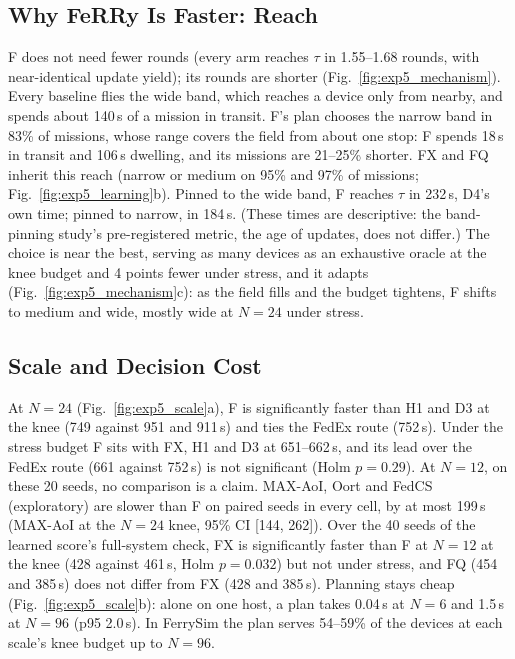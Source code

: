 
\subsection{Why FeRRy Is Faster: Reach}
\label{sec:res:mechanism}

F does not need fewer rounds (every arm reaches $\tau$ in 1.55--1.68 rounds,
with near-identical update yield); its rounds are shorter
(Fig.~\ref{fig:exp5_mechanism}). Every baseline flies the wide band, which
reaches a device only from nearby, and spends about 140\,s of a mission in
transit. F's plan chooses the narrow band in 83\% of missions, whose range
covers the field from about one stop: F spends 18\,s in transit and 106\,s
dwelling, and its missions are 21--25\% shorter. FX and FQ inherit this reach
(narrow or medium on 95\% and 97\% of missions; Fig.~\ref{fig:exp5_learning}b).
Pinned to the wide band, F reaches $\tau$ in 232\,s, D4's own time; pinned to
narrow, in 184\,s. (These times are descriptive: the band-pinning study's
pre-registered metric, the age of updates, does not differ.) The choice is near
the best, serving as many devices as an exhaustive oracle at the knee budget and
4 points fewer under stress, and it adapts (Fig.~\ref{fig:exp5_mechanism}c): as the
field fills and the budget tightens, F shifts to medium and wide, mostly wide at
$N=24$ under stress.


\subsection{Scale and Decision Cost}
\label{sec:res:scale}

At $N=24$ (Fig.~\ref{fig:exp5_scale}a), F is significantly faster than H1 and D3
at the knee (749 against 951 and 911\,s) and ties the FedEx route (752\,s). Under
the stress budget F sits with FX, H1 and D3 at 651--662\,s, and its lead over the
FedEx route (661 against 752\,s) is not significant (Holm $p=0.29$). At $N=12$, on
these 20 seeds, no comparison is a claim. MAX-AoI, Oort and FedCS (exploratory) are slower than F on paired seeds in every cell, by at most
199\,s (MAX-AoI at the $N=24$ knee, 95\% CI [144, 262]). Over the 40 seeds of the
learned score's full-system check, FX is significantly faster than F at $N=12$ at the knee (428 against
461\,s, Holm $p=0.032$) but not under stress, and FQ (454 and 385\,s) does not
differ from FX (428 and 385\,s).
Planning stays cheap (Fig.~\ref{fig:exp5_scale}b): alone on one host, a plan
takes 0.04\,s at $N=6$ and 1.5\,s at $N=96$ (p95 2.0\,s). In FerrySim the plan
serves 54--59\% of the devices at each scale's knee budget up to $N=96$.

